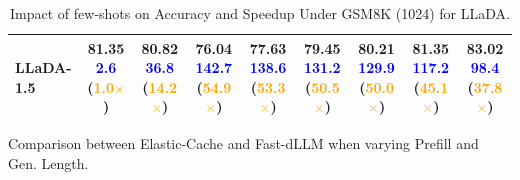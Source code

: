 \documentclass{article} %
\theoremstyle{definition}
\theoremstyle{remark}
\begin{document}
\begin{table}[t]
{\begin{tabular}{l|c|c|cccccc}
LLaDA-1.5\makecell{ \\ {}}
    & \makecell{81.35 \\ {\footnotesize \textcolor{blue}{2.6} (\textcolor{orange}{1.0\(\times\)})}}
    & \makecell{80.82 \\ {\footnotesize \textcolor{blue}{36.8} (\textcolor{orange}{14.2\(\times\)})}}
    & \makecell{76.04 \\ {\footnotesize \textcolor{blue}{142.7} (\textcolor{orange}{54.9\(\times\)})}}
    & \makecell{77.63 \\ {\footnotesize \textcolor{blue}{138.6} (\textcolor{orange}{53.3\(\times\)})}}
    & \makecell{79.45 \\ {\footnotesize \textcolor{blue}{131.2} (\textcolor{orange}{50.5\(\times\)})}}
    & \makecell{80.21 \\ {\footnotesize \textcolor{blue}{129.9} (\textcolor{orange}{50.0\(\times\)})}}
    & \makecell{81.35 \\ {\footnotesize \textcolor{blue}{117.2} (\textcolor{orange}{45.1\(\times\)})}}
    & \makecell{83.02 \\ {\footnotesize \textcolor{blue}{98.4} (\textcolor{orange}{37.8\(\times\)})}} \\

\bottomrule
\end{tabular}
}

\vspace{0.1in}
  \caption{Comparison between Elastic-Cache and Fast-dLLM when varying Prefill and Gen. Length.}
  \label{tab:pair}
  \vspace{-0.1in}
  \begin{subtable}[t]{0.48\textwidth}
    \centering
\caption{Impact of few-shots on Accuracy and Speedup Under GSM8K (1024) for LLaDA.}
\label{tab:lla-instruct-ablation-few-shot}
\end{subtable}
\end{table}
\end{document}
